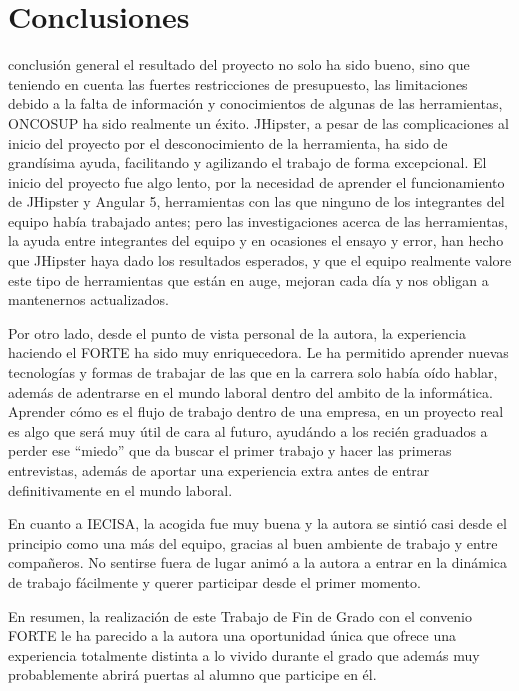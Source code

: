\chapter{Conclusiones}
\label{chap:conclusiones}


 conclusión general el resultado del proyecto no solo ha sido bueno, sino que teniendo en cuenta las fuertes restricciones de presupuesto, las limitaciones debido a la falta de información y conocimientos de algunas de las herramientas, ONCOSUP ha sido realmente un éxito. JHipster, a pesar de las complicaciones al inicio del proyecto por el desconocimiento de la herramienta, ha sido de grandísima ayuda, facilitando y agilizando el trabajo de forma excepcional. El inicio del proyecto fue algo lento, por la necesidad de aprender el funcionamiento de JHipster y Angular 5, herramientas con las que ninguno de los integrantes del equipo había trabajado antes; pero las investigaciones acerca de las herramientas, la ayuda entre integrantes del equipo y en ocasiones el ensayo y error, han hecho que JHipster haya dado los resultados esperados, y que el equipo realmente valore este tipo de herramientas que están en auge, mejoran cada día y nos obligan a mantenernos actualizados.

Por otro lado, desde el punto de vista personal de la autora, la experiencia haciendo el FORTE ha sido muy enriquecedora. Le ha permitido aprender nuevas tecnologías y formas de trabajar de las que en la carrera solo había oído hablar, además de adentrarse en el mundo laboral dentro del ambito de la informática. Aprender cómo es el flujo de trabajo dentro de una empresa, en un proyecto real es algo que será muy útil de cara al futuro, ayudándo a los recién graduados a perder ese ``miedo'' que da buscar el primer trabajo y hacer las primeras entrevistas, además de aportar una experiencia extra antes de entrar definitivamente en el mundo laboral.

En cuanto a IECISA, la acogida fue muy buena y la autora se sintió casi desde el principio como una más del equipo, gracias al buen ambiente de trabajo y entre compañeros. No sentirse fuera de lugar animó a la autora a entrar en la dinámica de trabajo fácilmente y querer participar desde el primer momento.

En resumen, la realización de este Trabajo de Fin de Grado con el convenio FORTE le ha parecido a la autora una oportunidad única que ofrece una experiencia totalmente distinta a lo vivido durante el grado que además muy probablemente abrirá puertas al alumno que participe en él.

